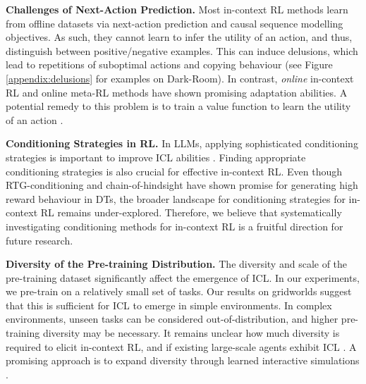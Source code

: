 \documentclass{article} %
\begin{document}
\textbf{Challenges of Next-Action Prediction.}
Most in-context RL methods learn from offline datasets via next-action prediction and causal sequence modelling objectives.
As such, they cannot learn to infer the utility of an action, and thus, distinguish between positive/negative examples. %
This can induce delusions, which lead to repetitions of suboptimal actions and copying behaviour \citep{Ortega:21} (see Figure \ref{appendix:delusions} for examples on Dark-Room).  
In contrast, \emph{online} in-context RL \citep{AdA:23,Grigsby:23,Lu:24} and online meta-RL methods \citep{Melo:22,Shala:24} have shown promising adaptation abilities.
A potential remedy to this problem is to train a value function to learn the utility of an action \citep{Zanette:21,Kumar:2020}.

\textbf{Conditioning Strategies in RL.}
In LLMs, applying sophisticated conditioning strategies is important to improve ICL abilities \citep{Wei:22,Yao:24,Agarwal:24}.
Finding appropriate conditioning strategies is also crucial for effective in-context RL.
Even though RTG-conditioning \citep{Chen:21} and chain-of-hindsight \citep{Liu:23} have shown promise for generating high reward behaviour in DTs, the broader landscape for conditioning strategies for in-context RL remains under-explored.
Therefore, we believe that systematically investigating conditioning methods for in-context RL is a fruitful direction for future research. 

\textbf{Diversity of the Pre-training Distribution.} 
The diversity and scale of the pre-training dataset significantly affect the emergence of ICL. 
In our experiments, we pre-train on a relatively small set of tasks.
Our results on gridworlds suggest that this is sufficient for ICL to emerge in simple environments.
In complex environments, unseen tasks can be considered out-of-distribution, and higher pre-training diversity may be necessary.
It remains unclear how much diversity is required to elicit in-context RL, and if existing large-scale agents exhibit ICL \citep{Reed:22,Raad:24}.
A promising approach is to expand diversity through learned interactive simulations \citep{Bruce:24}.
\end{document}
